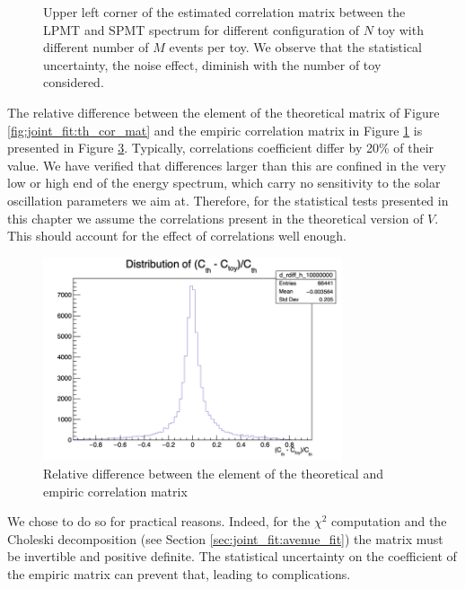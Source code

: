 \documentclass[../main.tex]{subfiles}
\begin{document}
\begin{figure}[ht]
\begin{subfigure}[t]{0.33\linewidth}
    \caption{}
    \label{fig:joint_fit:empirical_cor:cheff_kiss}
  \end{subfigure}
  \caption{Upper left corner of the estimated correlation matrix between the LPMT and SPMT spectrum for different configuration of $N$ toy with different number of $M$ events per toy. We observe that the statistical uncertainty, the noise effect, diminish with the number of toy considered.}
  \label{fig:joint_fit:empirical_cor}
\end{figure}


The relative difference between the element of the theoretical matrix of Figure \ref{fig:joint_fit:th_cor_mat} and the empiric correlation matrix in Figure \ref{fig:joint_fit:empirical_cor:cheff_kiss} is presented in Figure \ref{fig:joint_fit:th_em_diff}.
Typically,  correlations coefficient differ by 20\% of their value. We have verified that differences larger than this are confined in the very low or high end of the energy spectrum, which carry no sensitivity to the solar oscillation parameters we aim at. Therefore, for the statistical tests presented in this chapter we assume the correlations present in the theoretical version of $V$. This should account for the effect of correlations well enough.

\begin{figure}[ht]
  \centering
  \includegraphics[height=6cm]{images/joint_fit/th_em_corr_diff.png}
  \caption{Relative difference between the element of the theoretical and empiric correlation matrix}
  \label{fig:joint_fit:th_em_diff}
\end{figure}

We chose to do so for practical reasons. Indeed, for the $\chi^2$ computation and the Choleski decomposition (see Section \ref{sec:joint_fit:avenue_fit}) the matrix must be invertible and positive definite. The statistical uncertainty on the coefficient of the empiric matrix can prevent that, leading to complications.
\end{document}
